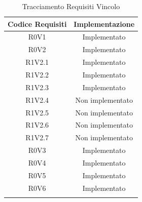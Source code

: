 \begin{longtable}{|c|c|}
	\hline
	\textbf{Codice Requisiti} & \textbf{Implementazione} \\
	\hline
	\endhead
	R0V1 & Implementato\\
	\hline
	R0V2 & Implementato\\
	\hline
	R1V2.1 & Implementato\\
	\hline
	R1V2.2 & Implementato\\
	\hline
	R1V2.3 & Implementato\\
	\hline
	R1V2.4 & Non implementato\\
	\hline
	R1V2.5 & Non implementato\\
	\hline
	R1V2.6 & Non implementato\\
	\hline
	R1V2.7 & Non implementato\\
	\hline
	R0V3 & Implementato\\
	\hline
	R0V4 & Implementato\\
	\hline
	R0V5 & Implementato\\
	\hline
	R0V6 & Implementato\\
	\hline
	\caption[Tracciamento Requisiti Vincolo]{Tracciamento Requisiti Vincolo}
\end{longtable}
\clearpage
